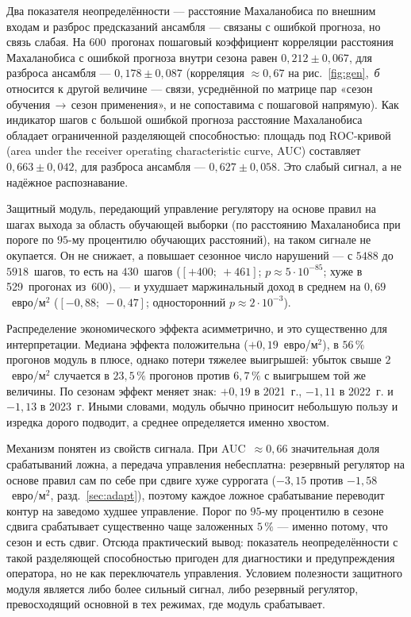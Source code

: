 \documentclass[12pt,a4paper,leqno]{article}
\begin{document}
Два показателя неопределённости — расстояние Махаланобиса по внешним входам
\cite{mahalanobis1936,lee2018} и разброс предсказаний ансамбля
\cite{lakshminarayanan2017} — связаны с ошибкой прогноза, но связь слабая. На
600~прогонах пошаговый коэффициент корреляции расстояния Махаланобиса с ошибкой прогноза
внутри сезона равен $0{,}212\pm0{,}067$, для разброса ансамбля — $0{,}178\pm0{,}087$
(корреляция $\approx0{,}67$ на рис.~\ref{fig:gen},~\emph{б} относится к другой величине —
связи, усреднённой по матрице пар «сезон обучения\,$\to$\,сезон применения», и не
сопоставима с пошаговой напрямую). Как индикатор шагов с большой ошибкой прогноза
расстояние Махаланобиса обладает ограниченной разделяющей способностью: площадь под
ROC-кривой (area under the receiver operating characteristic curve, AUC) составляет
$0{,}663\pm0{,}042$, для разброса ансамбля — $0{,}627\pm0{,}058$. Это слабый сигнал, а не
надёжное распознавание.

Защитный модуль, передающий управление регулятору на основе правил на шагах выхода за
область обучающей выборки (по расстоянию Махаланобиса при пороге по $95$-му процентилю
обучающих расстояний), на таком сигнале не окупается. Он не снижает, а повышает сезонное
число нарушений — с $5488$ до $5918$~шагов, то есть на $430$~шагов
($[+400;\ +461]$; $p\approx5\cdot10^{-85}$; хуже в 529~прогонах из~600), — и ухудшает
маржинальный доход в среднем на $0{,}69$~евро/м$^2$ ($[-0{,}88;\ -0{,}47]$;
односторонний $p\approx2\cdot10^{-3}$).

Распределение экономического эффекта асимметрично, и это существенно для интерпретации.
Медиана эффекта положительна ($+0{,}19$~евро/м$^2$), в $56\,\%$ прогонов модуль в плюсе,
однако потери тяжелее выигрышей: убыток свыше $2$~евро/м$^2$ случается в $23{,}5\,\%$
прогонов против $6{,}7\,\%$ с выигрышем той же величины. По сезонам эффект меняет знак:
$+0{,}19$ в 2021~г., $-1{,}11$ в 2022~г. и $-1{,}13$ в 2023~г. Иными словами, модуль
обычно приносит небольшую пользу и изредка дорого подводит, а среднее определяется
именно хвостом.

Механизм понятен из свойств сигнала. При AUC~$\approx0{,}66$ значительная доля
срабатываний ложна, а передача управления небесплатна: резервный регулятор на основе
правил сам по себе при сдвиге хуже суррогата ($-3{,}15$ против $-1{,}58$~евро/м$^2$,
разд.~\ref{sec:adapt}), поэтому каждое ложное срабатывание переводит контур на заведомо
худшее управление. Порог по $95$-му процентилю в сезоне сдвига срабатывает существенно
чаще заложенных $5\,\%$ — именно потому, что сезон и есть сдвиг. Отсюда практический
вывод: показатель неопределённости с такой разделяющей способностью пригоден для
диагностики и предупреждения оператора, но не как переключатель управления. Условием
полезности защитного модуля является либо более сильный сигнал, либо резервный
регулятор, превосходящий основной в тех режимах, где модуль срабатывает.
\end{document}
